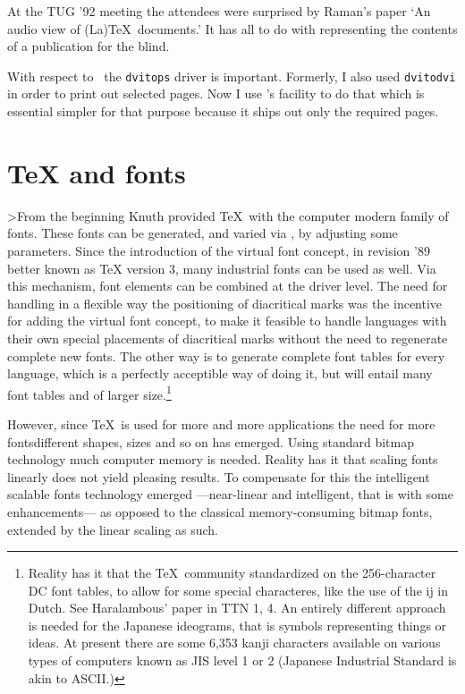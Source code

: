 At the TUG '92 meeting the attendees were surprised by Raman's paper
`An audio view of (La)\TeX\ documents.' It has all to do with
representing the contents of a publication for the blind.

With respect to \PS\ the \verb|dvitops| driver is important. Formerly,
I also used \verb|dvitodvi| in order to print out selected pages.
Now I use \mm's facility to do that which is essential
simpler for that purpose because it ships out only the required pages.

\section{\TeX{} and fonts}
>From the beginning Knuth provided \TeX\ with the computer modern family of
fonts. These fonts can be generated, and varied via \MF,
by adjusting some parameters.
Since the introduction of the virtual font concept, in revision '89
better known as \TeX{} version 3,
many industrial fonts can be used as well.
Via this mechanism, font elements can be combined at the driver level.
The need for handling in a flexible way the positioning of diacritical marks
was the incentive for adding the virtual font concept, to make it
feasible to handle languages with their own special placements of
diacritical marks without the need to
regenerate complete new fonts.
The other way is to generate complete font tables for every language,
which is a perfectly acceptible way of doing it,
but will entail many font tables and
of larger size.\footnote{Reality has it that the \TeX\ community standardized
   on the 256-character DC font tables, to allow for some special characteres,
   like the use of the ij in Dutch. See Haralambous' paper in TTN 1, 4.
   An entirely different approach is needed for the Japanese ideograms,
   that is symbols representing things or ideas. At present there are some
   6,353 kanji characters available on various types of computers known
   as JIS level 1 or 2 (Japanese Industrial Standard is akin to ASCII.)
}

However, since \TeX\ is used for more and more applications
the need for more fonts\Dash different shapes, sizes and so on\Dash
has emerged.
Using standard bitmap technology much computer memory is needed.
Reality has it that scaling fonts linearly does not yield
pleasing results.
To compensate for this the intelligent scalable fonts technology emerged%
---near-linear and intelligent, that is with some enhancements---%
as opposed to the classical memory-consuming bitmap fonts, extended by
the linear scaling as such.


